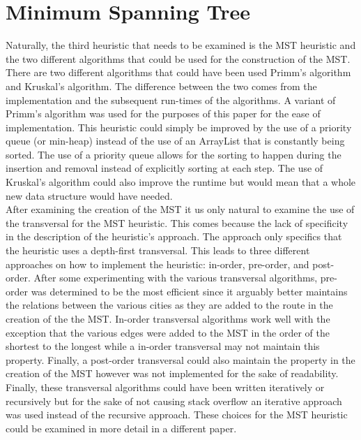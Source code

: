 \documentclass[midd]{thesis}
\newcommand{\tab}{\hspace*{2em}}
\begin{document}
\section{Minimum Spanning Tree}
\tab Naturally, the third heuristic that needs to be examined is the MST heuristic and the two different algorithms that could be used for the construction of the MST. There are two different algorithms that could have been used Primm's algorithm and Kruskal's algorithm. The difference between the two comes from the implementation and the subsequent run-times of the algorithms. A variant of Primm's algorithm was used for the purposes of this paper for the ease of implementation. This heuristic could simply be improved by the use of a priority queue (or min-heap) instead of the use of an ArrayList that is constantly being sorted. The use of a priority queue allows for the sorting to happen during the insertion and removal instead of explicitly sorting at each step. The use of Kruskal's algorithm could also improve the runtime but would mean that a whole new data structure would have needed.\\
\tab After examining the creation of the MST it us only natural to examine the use of the transversal for the MST heuristic. This comes because the lack of specificity in the description of the heuristic's approach. The approach only specifics that the heuristic uses a depth-first transversal. This leads to three different approaches on how to implement the heuristic: in-order, pre-order, and post-order. After some experimenting with the various transversal algorithms, pre-order was determined to be the most efficient since it arguably better maintains the relations between the various cities as they are added to the route in the creation of the the MST. In-order transversal algorithms work well with the exception that the various edges were added to the MST in the order of the shortest to the longest while a in-order transversal may not maintain this property. Finally, a post-order transversal could also maintain the property in the creation of the MST however was not implemented for the sake of readability. Finally, these transversal algorithms could have been written iteratively or recursively but for the sake of not causing stack overflow an iterative approach was used instead of the recursive approach. These choices for the MST heuristic could be examined in more detail in a different paper.\\
\end{document}

